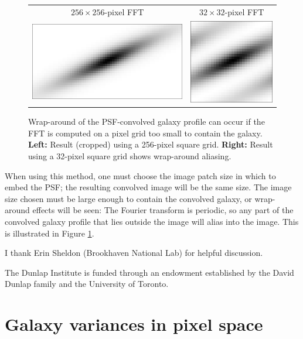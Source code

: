 \documentclass[11pt,preprint]{aastex}
\newcommand{\trick}{method}
\begin{document}
\begin{figure}
\begin{center}
\begin{tabular}{@{}cc@{}}
  $256 \times 256$-pixel FFT &
  $32 \times 32$-pixel FFT \\
  \includegraphics[height=0.22\textwidth]{gal-00} &
  \includegraphics[height=0.22\textwidth]{gal-01} \\
\end{tabular}
\end{center}
\caption{\label{fig:wrap}%
  Wrap-around of the PSF-convolved galaxy profile can occur if the FFT is
  computed on a pixel grid too small to contain the galaxy.
  \textbf{Left:} Result (cropped) using a 256-pixel square grid.
  \textbf{Right:} Result using a 32-pixel square grid shows wrap-around
  aliasing.
}
\end{figure}

When using this \trick, one must choose the image patch size in which
to embed the PSF; the resulting convolved image will be the same size.
The image size chosen must be large enough to contain the convolved
galaxy, or wrap-around effects will be seen: The Fourier transform is
periodic, so any part of the convolved galaxy profile that lies
outside the image will alias into the image.  This is
illustrated in Figure \ref{fig:wrap}.



\acknowledgements

I thank Erin Sheldon (Brookhaven National Lab) for helpful discussion.

The Dunlap Institute is funded through an endowment established by the David Dunlap family and the University of Toronto.




\appendix

\section{Galaxy variances in pixel space}
\label{app:transform}
\end{document}
